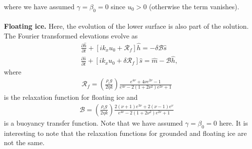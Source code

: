\documentclass[paper=a4, fontsize=11pt]{article}
\begin{document}
where we have assumed $\gamma=\beta_0=0$  since $u_0>0$ (otherwise the term vanishes).
\\ \\
\textbf{Floating ice.} Here, the evolution of the lower surface
is also part of the solution.
The Fourier transformed elevations evolve as
\begin{align}
&\frac{\partial \hat{h}}{\partial t}+ \left[ik_xu_0  + \mathcal{R}_f\right]\hat{h} = -\delta\mathcal{B}\hat{s}\label{hf}\\
&\frac{\partial \hat{s}}{\partial t}+ [ik_xu_0 + \delta\mathcal{R}_f]\hat{s} = \hat{m} - \mathcal{B} \hat{h}, \label{sf}
\end{align}
where
\begin{align}
\mathcal{R}_f = \left(\frac{\rho_i g}{2\eta k}\right) \frac{e^{4\nu} +4\nu e^{2\nu} -1 }{e^{4\nu} -2(1+2\nu^2)e^{2\nu} +1}
\end{align}
is the relaxation function for floating ice and
\begin{align}
\mathcal{B} = \left(\frac{\rho_i g}{2\eta k}\right) \frac{ 2(\nu+1)e^{3\nu}+2(\nu-1)e^{\nu} }{e^{4\nu} -2(1+2\nu^2)e^{2\nu} +1}
\end{align}
is a buoyancy transfer function. Note that we have assumed $\gamma=\beta_0=0$ here.
It is interesting to note that the relaxation functions for grounded and floating
ice are not the same.
\end{document}
